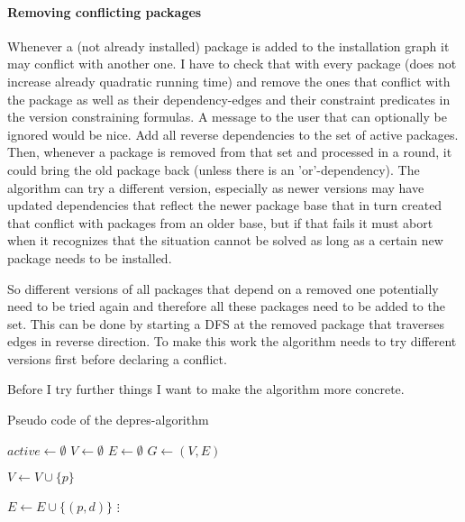 \documentclass[a4paper]{scrartcl}
\begin{document}
	\paragraph{Removing conflicting packages} Whenever a (not already installed) package is added to the installation graph it may conflict with another one. I have to check that with every package (does not increase already quadratic running time) and remove the ones that conflict with the package as well as their dependency-edges and their constraint predicates in the version constraining formulas. A message to the user that can optionally be ignored would be nice. Add all reverse dependencies to the set of active packages. Then, whenever a package is removed from that set and processed in a round, it could bring the old package back (unless there is an 'or'-dependency). The algorithm can try a different version, especially as newer versions may have updated dependencies that reflect the newer package base that in turn created that conflict with packages from an older base, but if that fails it must abort when it recognizes that the situation cannot be solved as long as a certain new package needs to be installed.
	
	So different versions of all packages that depend on a removed one potentially need to be tried again and therefore all these packages need to be added to the set. This can be done by starting a DFS at the removed package that traverses edges in reverse direction. To make this work the algorithm needs to try different versions first before declaring a conflict.
	
	
	\vspace{1eM}
	Before I try further things I want to make the algorithm more concrete.
	
	\begin{algorithm}[ht]
		\caption{Pseudo code of the depres-algorithm}
		\label{alg:pseudo_code_of_the_depres_algorithm}
		
		\begin{algorithmic}
			\State $active\gets \emptyset$
			\State $V\gets \emptyset$
			\State $E\gets \emptyset$
			\State $G\gets (V, E)$
			
				\State $V\gets V\cup \{p\}$
			\EndFor
				
					\State $E\gets E\cup \{(p,d)\}$
				\EndFor
			\EndFor
			\State $\vdots$
		\end{algorithmic}
	\end{algorithm}
\end{document}
